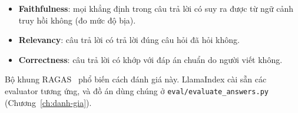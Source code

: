 \begin{itemize}
  \item \textbf{Faithfulness}: mọi khẳng định trong câu trả lời có suy ra được từ ngữ cảnh truy hồi không (đo mức độ bịa).
  \item \textbf{Relevancy}: câu trả lời có trả lời đúng câu hỏi đã hỏi không.
  \item \textbf{Correctness}: câu trả lời có khớp với đáp án chuẩn do người viết không.
\end{itemize}

Bộ khung RAGAS~\cite{es2023ragas} phổ biến cách đánh giá này. LlamaIndex cài sẵn các evaluator tương ứng, và đồ án dùng chúng ở \texttt{eval/evaluate\_answers.py} (Chương~\ref{ch:danh-gia}).
